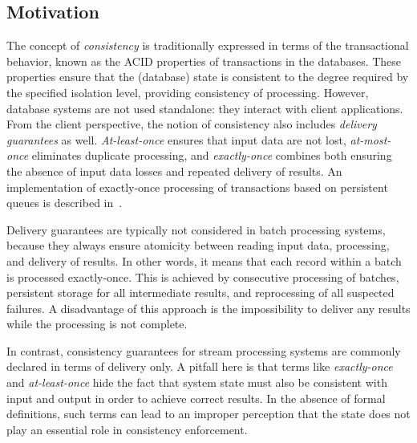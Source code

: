 
\subsection{Motivation}
The concept of {\em consistency} is traditionally expressed in terms of the transactional behavior, known as the ACID properties of transactions in the databases. 
 These properties ensure that the (database) state is consistent to the degree required by the specified isolation level, providing consistency of processing. 
 However, database systems are not used standalone: they interact with client applications.
  From the client perspective,   the notion of consistency also includes {\em delivery guarantees} as well. {\em At-least-once} ensures that input data are not lost, {\em at-most-once} eliminates duplicate processing, and {\em exactly-once} combines both ensuring the absence of input data losses and repeated delivery of results. An implementation of exactly-once processing of transactions based on persistent queues is described in~\cite{DBLP:books/mk/WeikumV2002}.

Delivery guarantees are typically not considered in batch processing systems, because they always ensure atomicity between reading input data, processing, and delivery of results. In other words, it means that each record within a batch is processed exactly-once. This is achieved by consecutive processing of batches, persistent storage for all intermediate results, and reprocessing of all suspected failures. 
A disadvantage of this approach is the impossibility to deliver any results while the processing is not complete.

In contrast,   consistency guarantees for stream processing systems are commonly declared in terms of delivery only. 
A pitfall here is that terms like {\em exactly-once} and {\em at-least-once} hide the fact that system state must also be consistent with input and output in order to achieve correct results. 
In the absence of formal definitions, such terms can lead to an improper perception that the state does not play an essential role in consistency enforcement. 

